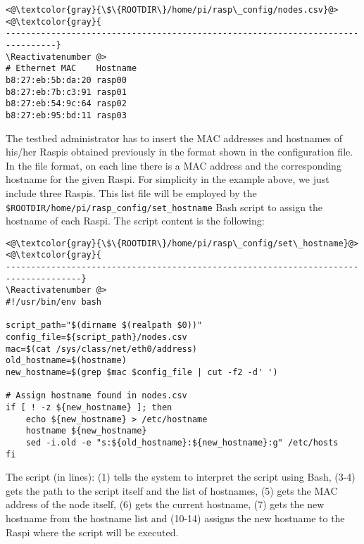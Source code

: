 \Suppressnumber\begin{lstlisting}[]
<@\textcolor{gray}{\$\{ROOTDIR\}/home/pi/rasp\_config/nodes.csv}@>
<@\textcolor{gray}{
--------------------------------------------------------------------------------}
\Reactivatenumber @>
# Ethernet MAC    Hostname
b8:27:eb:5b:da:20 rasp00
b8:27:eb:7b:c3:91 rasp01
b8:27:eb:54:9c:64 rasp02
b8:27:eb:95:bd:11 rasp03
\end{lstlisting}
\FloatBarrier
\vspace{-5mm}

The testbed administrator has to insert the \ac{MAC} addresses and hostnames
of his/her \ac{Raspi}s obtained previously in the format shown in the
configuration file. In the file format, on each line there is a \ac{MAC}
address and the corresponding hostname for the given \ac{Raspi}. For
simplicity in the example above, we just include three \ac{Raspi}s.
This list file will be employed by the
\texttt{\${ROOTDIR}/home/pi/rasp\_config/set\_hostname}
\ac{Bash} script to assign the hostname of each \ac{Raspi}.
The script content is the following:

\Suppressnumber\begin{lstlisting}[]
<@\textcolor{gray}{\$\{ROOTDIR\}/home/pi/rasp\_config/set\_hostname}@>
<@\textcolor{gray}{
-------------------------------------------------------------------------------------}
\Reactivatenumber @>
#!/usr/bin/env bash

script_path="$(dirname $(realpath $0))"
config_file=${script_path}/nodes.csv
mac=$(cat /sys/class/net/eth0/address)
old_hostname=$(hostname)
new_hostname=$(grep $mac $config_file | cut -f2 -d' ')

# Assign hostname found in nodes.csv
if [ ! -z ${new_hostname} ]; then
    echo ${new_hostname} > /etc/hostname
    hostname ${new_hostname}
    sed -i.old -e "s:${old_hostname}:${new_hostname}:g" /etc/hosts
fi
\end{lstlisting}
\FloatBarrier
\vspace{-5mm}

The script (in lines): (1) tells the system to interpret the script
using \ac{Bash}, (3-4) gets the path to the script itself and the list of
hostnames, (5) gets the \ac{MAC} address of the node itself, (6) gets the
current hostname, (7) gets the new hostname from the hostname list and
(10-14) assigns the new hostname to the \ac{Raspi} where the script
will be executed.

